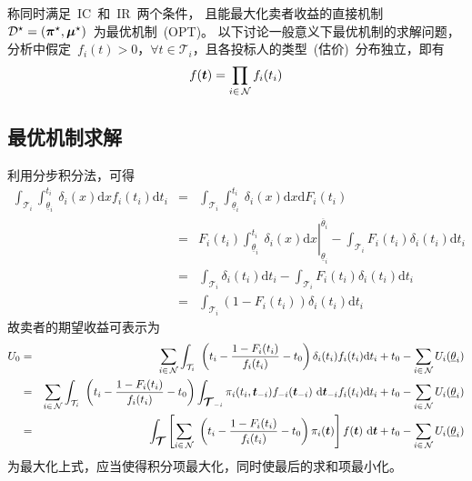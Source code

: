 \documentclass[a4paper,12pt]{article}
\newcommand{\mv}[1]{\mbox{\boldmath$#1$}}         %
\newcommand{\id}{\mathrm{d}}                      %
\begin{document}
称同时满足~IC~和~IR~两个条件，
且能最大化卖者收益的直接机制~$\mathcal{D}^\star=(\mv{\pi}^\star,\mv{\mu}^\star)$~为最优机制~(OPT)。
以下讨论一般意义下最优机制的求解问题，分析中假定~$f_i(t)>0$，$\forall
t\in\mathcal{T}_i$，且各投标人的类型~(估价)~分布独立，即有
\begin{equation}
    f(\mv{t}) = \prod_{i\in\,\mathcal{N}}f_i(t_i)
\end{equation}

\subsection{最优机制求解}

利用分步积分法，可得
\begin{eqnarray*}
  \int_{\mathcal{T}_i}\int_{\underline{\theta}_i}^{t_i}~\delta_i(x)\id x f_i(t_i)\id t_i &=&
  \int_{\mathcal{T}_i}\int_{\underline{\theta}_i}^{t_i}~\delta_i(x)\id x \id F_i(t_i) \\
   &=& \left.F_i(t_i)\int_{\underline{\theta}_i}^{t_i}~\delta_i(x)\id x
       \right|_{\underline{\theta}_i}^{\overline{\theta}_i}
    -  \int_{\mathcal{T}_i}F_i(t_i)\delta_i(t_i)\id t_i\\
   &=& \int_{\mathcal{T}_i}\delta_i(t_i)\id t_i - \int_{\mathcal{T}_i}F_i(t_i)\delta_i(t_i)\id t_i \\
   &=& \int_{\mathcal{T}_i}\left(1 - F_i(t_i)\right)\delta_i(t_i)\id t_i
\end{eqnarray*}
故卖者的期望收益可表示为
\begin{eqnarray}
\nonumber
  U_0 &=& \sum_{i\in\,\mathcal{N}}\int_{\mathcal{T}_i}~
          \left(t_i -\frac{1 - F_i(t_i)}{f_i(t_i)} - t_0\right)\delta_i(t_i)f_i(t_i)\id t_i
          + t_0 - \sum_{i\in\,\mathcal{N}}U_i(\underline{\theta}_i) \\
\nonumber
      &=& \sum_{i\in\,\mathcal{N}}\int_{\mathcal{T}_i}~
          \left(t_i -\frac{1 - F_i(t_i)}{f_i(t_i)} - t_0\right)\int_{\mv{\mathcal{T}}_{-i}}
          \pi_i(t_i,\mv{t}_{-i})f_{-i}(\mv{t}_{-i})~\id\mv{t}_{-i}f_i(t_i)\id t_i
          + t_0 - \sum_{i\in\,\mathcal{N}}U_i(\underline{\theta}_i)\\
      &=& \int_{\mv{\mathcal{T}}}\left[\sum_{i\in\,\mathcal{N}}~
          \left(t_i -\frac{1 - F_i(t_i)}{f_i(t_i)} - t_0\right)\pi_i(\mv{t})\right]f(\mv{t})~\id\mv{t}
          + t_0 - \sum_{i\in\,\mathcal{N}}U_i(\underline{\theta}_i)
\label{mech:revenue:seller}
\end{eqnarray}
为最大化上式，应当使得积分项最大化，同时使最后的求和项最小化。
\end{document}
